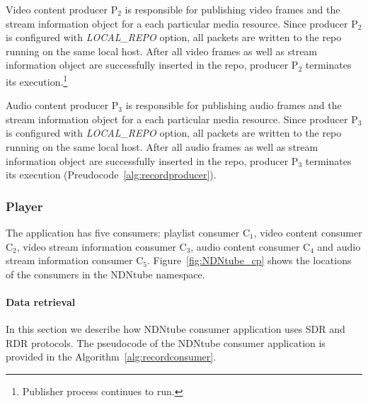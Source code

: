 Video content producer P$_{\text{2}}$ is responsible for publishing video frames and the stream information object for a each particular media resource. Since producer P$_{\text{2}}$ is configured with \textit{LOCAL\_REPO} option, all packets are written to the repo running on the same local host. After all video frames as well as stream information object are successfully inserted in the repo, producer P$_{\text{2}}$ terminates its execution.\footnote{Publisher process continues to run.} 

Audio content producer P$_{\text{3}}$ is responsible for publishing audio frames and the stream information object for a each particular media resource. Since producer P$_{\text{3}}$ is configured with \textit{LOCAL\_REPO} option, all packets are written to the repo running on the same local host. After all audio frames as well as stream information object are successfully inserted in the repo, producer P$_{\text{3}}$ terminates its execution (Preudocode~\ref{alg:recordproducer}).

\subsubsection{Player}

The application has five consumers: playlist consumer C$_{\text{1}}$, video content consumer C$_{\text{2}}$, video stream information consumer C$_{\text{3}}$, audio content consumer C$_{\text{4}}$ and audio stream information consumer C$_{\text{5}}$. Figure~\ref{fig:NDNtube_cp} shows the locations of the consumers in the NDNtube namespace.


\paragraph{Data retrieval} %
\label{par:NDNtube_data_retrieval}
\vspace{0.1cm}

In this section we describe how NDNtube consumer application uses SDR and RDR protocols. The pseudocode of the NDNtube consumer application is provided in the Algorithm~\ref{alg:recordconsumer}.

